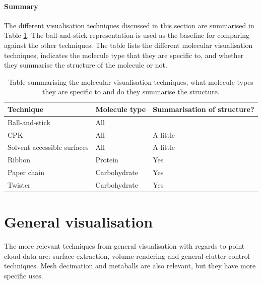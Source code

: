 
\paragraph{Summary}

The different visualisation techniques discussed in this section are summarised
in Table \ref{tab:background_molecular}. The ball-and-stick representation is
used as the baseline for comparing against the other techniques. The table
lists the different molecular visualisation techniques, indicates the molecule
type that they are specific to, and whether they summarise the structure of the
molecule or not.

\begin{table}
  \begin{tabular}{ | l | l | l | }
  \hline
  Technique                   & Molecule type & Summarisation of structure?  \\ \hline
  Ball-and-stick              & All           &                              \\ \hline
  CPK                         & All           & A little                     \\ \hline
  Solvent accessible surfaces & All           & A little                     \\ \hline
  Ribbon                      & Protein       & Yes                          \\ \hline
  Paper chain                 & Carbohydrate  & Yes                          \\ \hline
  Twister                     & Carbohydrate  & Yes                          \\ \hline
  \end{tabular}
  \caption{Table summarising the molecular visualisation techniques, what
  molecule types they are specific to and do they summarise the structure.}
  \label{tab:background_molecular}
\end{table}



\section{General visualisation}
\label{sec:background_general}


The more relevant techniques from general visualisation with regards to point
cloud data are: surface extraction, volume rendering and general clutter
control techniques. Mesh decimation and metaballs are also relevant, but they
have more specific uses.

